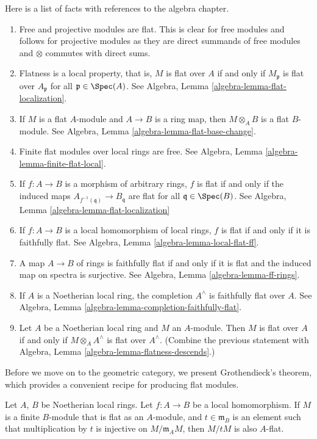 \noindent
Here is a list of facts with references to the algebra chapter.
\begin{enumerate}
\item Free and projective modules are flat. This is clear for free modules
and follows for projective modules as they are direct summands of free
modules and $\otimes$ commutes with direct sums.
\item Flatness is a local property, that is, $M$ is flat over $A$
if and only if $M_{\mathfrak p}$ is flat over $A_{\mathfrak p}$ for all
$\mathfrak p \in \Spec(A)$.
See Algebra, Lemma \ref{algebra-lemma-flat-localization}.
\item If $M$ is a flat $A$-module and $A \to B$ is a ring map,
then $M \otimes_A B$ is a flat $B$-module. See
Algebra, Lemma \ref{algebra-lemma-flat-base-change}.
\item Finite flat modules over local rings are free.
See Algebra, Lemma \ref{algebra-lemma-finite-flat-local}.
\item If $f : A \to B$ is a morphism of arbitrary rings,
$f$ is flat if and only if the induced maps
$A_{f^{-1}(\mathfrak q)} \to B_{\mathfrak q}$ are flat for all
$\mathfrak q \in \Spec(B)$.
See Algebra, Lemma \ref{algebra-lemma-flat-localization}
\item If $f : A \to B$ is a local homomorphism of local rings,
$f$ is flat if and only if it is faithfully flat.
See Algebra, Lemma \ref{algebra-lemma-local-flat-ff}.
\item A map $A \to B$ of rings is faithfully flat if and only if it is
flat and the induced map on spectra is surjective.
See Algebra, Lemma \ref{algebra-lemma-ff-rings}.
\item If $A$ is a Noetherian local ring, the completion
$A^\wedge$ is faithfully flat over $A$.
See Algebra, Lemma \ref{algebra-lemma-completion-faithfully-flat}.
\item Let $A$ be a Noetherian local ring and $M$ an $A$-module.
Then $M$ is flat over $A$ if and only if $M \otimes_A A^\wedge$
is flat over $A^\wedge$. (Combine the previous statement with
Algebra, Lemma \ref{algebra-lemma-flatness-descends}.)
\end{enumerate}
Before we move on to the geometric category, we present Grothendieck's
theorem, which provides a convenient recipe for producing flat
modules.

\begin{theorem}
\label{theorem-flatness-grothendieck}
Let $A$, $B$ be Noetherian local rings.
Let $f : A \to B$ be a local homomorphism.
If $M$ is a finite $B$-module that is flat as an $A$-module,
and $t \in \mathfrak m_B$ is an element such that multiplication
by $t$ is injective on $M/\mathfrak m_AM$, then $M/tM$ is also $A$-flat.
\end{theorem}

